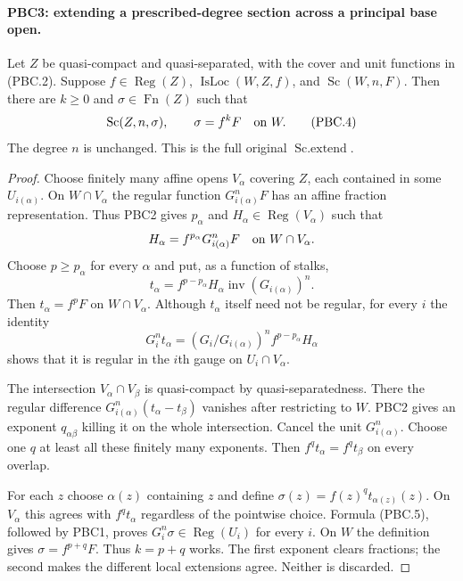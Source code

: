 \paragraph{PBC3: extending a prescribed-degree section across a principal base open.}
\label{claim:PBC3}
Let $Z$ be quasi-compact and quasi-separated, with the cover and
unit functions in (PBC.2).  Suppose $f\in\operatorname{Reg}(Z)$,
$\operatorname{IsLoc}(W,Z,f)$, and
$\operatorname{Sc}(W,n,F)$.  Then there are $k\ge0$ and
$\sigma\in\operatorname{Fn}(Z)$ such that
\[
 \operatorname{Sc}(Z,n,\sigma),\qquad
 \sigma=f^kF\quad\hbox{on }W.
                                                        \tag{PBC.4}
\]
The degree $n$ is unchanged.  This is the full original
$\operatorname{Sc.extend}$.

\begin{proof}
Choose finitely many affine opens $V_\alpha$ covering $Z$, each
contained in some $U_{i(\alpha)}$.  On
$W\cap V_\alpha$ the regular function
$G_{i(\alpha)}^nF$ has an affine fraction representation.  Thus
PBC2 gives $p_\alpha$ and $H_\alpha\in\operatorname{Reg}(V_\alpha)$
such that
\[
 H_\alpha=f^{p_\alpha}G_{i(\alpha)}^nF
       \quad\hbox{on }W\cap V_\alpha.
\]
Choose $p\ge p_\alpha$ for every $\alpha$ and put, as a function of
stalks,
\[
 t_\alpha=f^{p-p_\alpha}H_\alpha
                    \operatorname{inv}(G_{i(\alpha)})^n.
\]
Then $t_\alpha=f^pF$ on $W\cap V_\alpha$.  Although $t_\alpha$
itself need not be regular, for every $i$ the identity
\[
 G_i^nt_\alpha
  =(G_i/G_{i(\alpha)})^n f^{p-p_\alpha}H_\alpha
                                                        \tag{PBC.5}
\]
shows that it is regular in the $i$th gauge on $U_i\cap V_\alpha$.

The intersection $V_\alpha\cap V_\beta$ is quasi-compact by
quasi-separatedness.  There the regular difference
$G_{i(\alpha)}^n(t_\alpha-t_\beta)$ vanishes after restricting to
$W$.  PBC2 gives an exponent $q_{\alpha\beta}$ killing it on the
whole intersection.  Cancel the unit $G_{i(\alpha)}^n$.
Choose one $q$ at least all these finitely many exponents.  Then
$f^qt_\alpha=f^qt_\beta$ on every overlap.

For each $z$ choose $\alpha(z)$ containing $z$ and define
$\sigma(z)=f(z)^qt_{\alpha(z)}(z)$.  On $V_\alpha$ this agrees
with $f^qt_\alpha$ regardless of the pointwise choice.  Formula
(PBC.5), followed by PBC1, proves
$G_i^n\sigma\in\operatorname{Reg}(U_i)$ for every $i$.
On $W$ the definition gives $\sigma=f^{p+q}F$.  Thus $k=p+q$
works.  The first exponent clears fractions; the second makes the
different local extensions agree.  Neither is discarded.
\end{proof}

